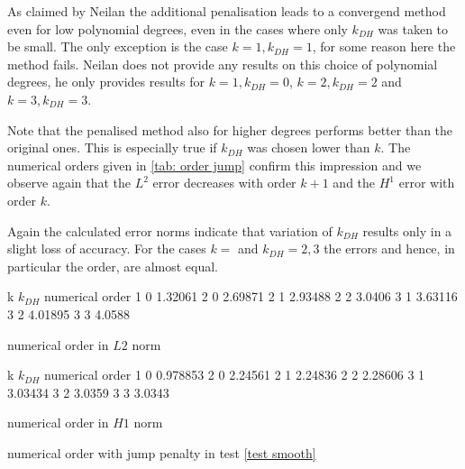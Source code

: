 As claimed by Neilan the additional penalisation leads to a convergend method even for low polynomial degrees, even in the cases where only $k_{DH}$ was taken to be small. The only exception is the case $k=1, k_{DH}=1$, for some reason here the method fails. Neilan does not provide any results on this choice of polynomial degrees, he only provides results for $k=1, k_{DH}=0$, $k=2, k_{DH}=2$ and $k=3, k_{DH}=3$. 

Note that the penalised method also for higher degrees performs better than the original ones. This is especially true if $k_{DH}$ was chosen lower than $k$. The numerical orders given in \ref{tab: order jump} confirm this impression and we observe again that the $L^2$ error decreases with order $k+1$ and the $H^1$ error with order $k$. 

Again the calculated error norms indicate that variation of $k_{DH}$ results only in a slight loss of accuracy. For the cases $k=$ and $k_{DH} = 2,3$ the errors and hence, in particular the order, are almost equal. 


\begin{table}[H]
\centering
\begin{subtable}[b]{0.45\textwidth}
	\pgfplotstabletypeset
	{
		k $k_{DH}$ {numerical order}
		1 0 1.32061
		2 0 2.69871
		2 1 2.93488
		2 2 3.0406
		3 1 3.63116
		3 2 4.01895
		3 3 4.0588
	}
	\caption{numerical order in $L2$ norm}
	\end{subtable}
	\begin{subtable}[b]{0.45\textwidth}
	\pgfplotstabletypeset
	{
		k $k_{DH}$ {numerical order}
		1 0 0.978853
		2 0 2.24561
		2 1 2.24836
		2 2 2.28606
		3 1 3.03434
		3 2 3.0359
		3 3  3.0343
	}
	\caption{numerical order in $H1$ norm}
	\end{subtable}
	\caption{numerical order with jump penalty in test \ref{test smooth}}
\label{tab: order jump}
\end{table}
